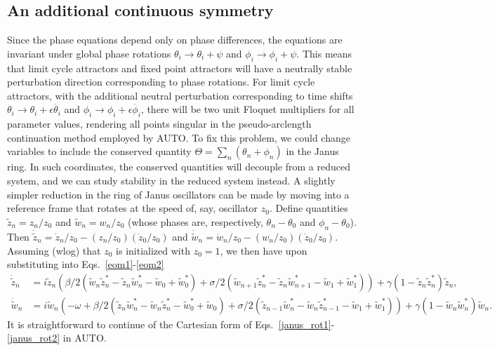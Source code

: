 \documentclass[aps,pre,amsmath,amssymb,floatfix,onecolumn,notitlepage,10pt]{revtex4-1}
\begin{document}
\subsection{An additional continuous symmetry}
Since the phase equations depend only on phase differences, the equations are invariant under global phase rotations $\theta_i\to\theta_i+\psi$ and $\phi_i\to \phi_i+\psi$.  This means that limit cycle attractors and fixed point attractors will have a neutrally stable perturbation direction corresponding to phase rotations. For limit cycle attractors, with the additional neutral perturbation corresponding to time shifts $\theta_i\to\theta_i+\epsilon\dot{\theta_i}$ and $\phi_i\to\phi_i+\epsilon\dot{\phi_i}$, there will be two unit Floquet multipliers for all parameter values, rendering all points singular in the pseudo-arclength continuation method employed by AUTO. To fix this problem, we could change variables to include the conserved quantity $\Theta = \sum_n \left(\theta_n + \phi_n\right)$ in the Janus ring. In such coordinates, the conserved quantities will decouple from a reduced system, and we can study stability in the reduced system instead.  A slightly simpler reduction in the ring of Janus oscillators can be made by moving into a reference frame that rotates at the speed of, say, oscillator $z_0$. Define quantities $\tilde{z}_n = z_n/z_0$ and $\tilde{w}_n = w_n/z_0$ (whose phases are, respectively, $\theta_n-\theta_0$ and $\phi_n-\theta_0$).  Then $\dot {\tilde z}_n = \dot z_n / z_0 - \left(z_n/z_0\right)\left( \dot z_0/z_0\right)$ and $\dot {\tilde w}_n = \dot w_n / z_0 - \left(w_n/z_0\right) \left(\dot z_0/z_0\right)$. Assuming (wlog) that $z_0$ is initialized with $z_0=1$, we then have upon substituting into Eqs.~\ref{eom1}-\ref{eom2}
\begin{align}
\dot {\tilde z}_n &= i{\tilde z}_n\left(  \beta/2\left({\tilde w}_n{\tilde z}_n^*-{\tilde z}_n{\tilde w}_n^* - {\tilde w}_0+{\tilde w}_0^*\right) + \sigma/2\left({\tilde w}_{n+1}{\tilde z}_n^*-{\tilde z}_n{\tilde w}_{n+1}^* - {\tilde w}_1+{\tilde w}_1^*\right)\right) + \gamma\left(1-{\tilde z}_n{\tilde z}_n^*\right){\tilde z}_n, \label{janus_rot1}\\
\dot {\tilde w}_n &= i{\tilde w}_n\left( -\omega + \beta/2\left({\tilde z}_n{\tilde w}_n^*-{\tilde w}_n{\tilde z}_n^* -{\tilde w}_0^*+{\tilde w}_0 \right) + \sigma/2\left({\tilde z}_{n-1}{\tilde w}_n^*-{\tilde w}_n{\tilde z}_{n-1}^* - {\tilde w}_1+{\tilde w}_1^*\right)\right) + \gamma\left(1-{\tilde w}_n{\tilde w}_n^*\right){\tilde w}_n. \label{janus_rot2}
\end{align}
It is straightforward to continue of the Cartesian form of Eqs.~\eqref{janus_rot1}-\eqref{janus_rot2} in AUTO.
\end{document}
